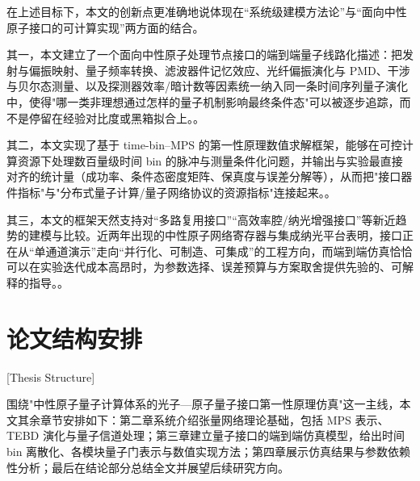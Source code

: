 在上述目标下，本文的创新点更准确地说体现在“系统级建模方法论”与“面向中性原子接口的可计算实现”两方面的结合。

其一，本文建立了一个面向中性原子处理节点接口的端到端量子线路化描述：把发射与偏振映射、量子频率转换、滤波器件记忆效应、光纤偏振演化与 PMD、干涉与贝尔态测量、以及探测器效率/暗计数等因素统一纳入同一条时间序列量子演化中，使得"哪一类非理想通过怎样的量子机制影响最终条件态"可以被逐步追踪，而不是停留在经验对比度或黑箱拟合上。\cite{vanleent2022entangling}。%

其二，本文实现了基于 time-bin–MPS 的第一性原理数值求解框架，能够在可控计算资源下处理数百量级时间 bin 的脉冲与测量条件化问题，并输出与实验最直接对齐的统计量（成功率、条件态密度矩阵、保真度与误差分解等），从而把"接口器件指标"与"分布式量子计算/量子网络协议的资源指标"连接起来。\cite{Pichler2016TimeDelaysMPS,Yanagimoto2021MPSQuantumPulsePropagation,Sinclair2024FaultTolerantOpticalInterconnectsNeutralAtoms}。%

其三，本文的框架天然支持对“多路复用接口”“高效率腔/纳光增强接口”等新近趋势的建模与比较。近两年出现的中性原子网络寄存器与集成纳光平台表明，接口正在从“单通道演示”走向“并行化、可制造、可集成”的工程方向，而端到端仿真恰恰可以在实验迭代成本高昂时，为参数选择、误差预算与方案取舍提供先验的、可解释的指导。\cite{Hartung2024QuantumNetworkRegisterTweezerCavity,Menon2024IntegratedAtomArrayNanophotonicChip}。%

\section{论文结构安排}[Thesis Structure]

围绕"中性原子量子计算体系的光子—原子量子接口第一性原理仿真"这一主线，本文其余章节安排如下：第二章系统介绍张量网络理论基础，包括 MPS 表示、TEBD 演化与量子信道处理；第三章建立量子接口的端到端仿真模型，给出时间 bin 离散化、各模块量子门表示与数值实现方法；第四章展示仿真结果与参数依赖性分析；最后在结论部分总结全文并展望后续研究方向。
